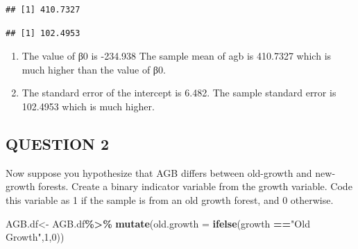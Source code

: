 \documentclass[
]{article}
\newenvironment{Shaded}{\begin{snugshade}}{\end{snugshade}}
\newcommand{\AttributeTok}[1]{\textcolor[rgb]{0.13,0.29,0.53}{#1}}
\newcommand{\CommentTok}[1]{\textcolor[rgb]{0.56,0.35,0.01}{\textit{#1}}}
\newcommand{\DecValTok}[1]{\textcolor[rgb]{0.00,0.00,0.81}{#1}}
\newcommand{\FunctionTok}[1]{\textcolor[rgb]{0.13,0.29,0.53}{\textbf{#1}}}
\newcommand{\NormalTok}[1]{#1}
\newcommand{\OtherTok}[1]{\textcolor[rgb]{0.56,0.35,0.01}{#1}}
\newcommand{\SpecialCharTok}[1]{\textcolor[rgb]{0.81,0.36,0.00}{\textbf{#1}}}
\newcommand{\StringTok}[1]{\textcolor[rgb]{0.31,0.60,0.02}{#1}}
\providecommand{\tightlist}{%
  \setlength{\itemsep}{0pt}\setlength{\parskip}{0pt}}
\begin{document}
\begin{Shaded}
\end{Shaded}

\begin{verbatim}
## [1] 410.7327
\end{verbatim}

\begin{Shaded}
\end{Shaded}

\begin{verbatim}
## [1] 102.4953
\end{verbatim}

\begin{enumerate}
\def\labelenumi{\alph{enumi})}
\tightlist
\item
  The value of β0 is -234.938 The sample mean of agb is 410.7327 which
  is much higher than the value of β0.
\item
  The standard error of the intercept is 6.482. The sample standard
  error is 102.4953 which is much higher.
\end{enumerate}

\hypertarget{question-2}{%
\subsection{QUESTION 2}\label{question-2}}

Now suppose you hypothesize that AGB differs between old-growth and
new-growth forests. Create a binary indicator variable from the growth
variable. Code this variable as 1 if the sample is from an old growth
forest, and 0 otherwise.

\begin{Shaded}
\begin{Highlighting}[]
\NormalTok{AGB.df}\OtherTok{\textless{}{-}}\NormalTok{ AGB.df}\SpecialCharTok{\%\textgreater{}\%}
  \FunctionTok{mutate}\NormalTok{(}\AttributeTok{old.growth =} \FunctionTok{ifelse}\NormalTok{(growth }\SpecialCharTok{==}\StringTok{"Old Growth"}\NormalTok{,}\DecValTok{1}\NormalTok{,}\DecValTok{0}\NormalTok{))}
\end{Highlighting}
\end{Shaded}
\end{document}
